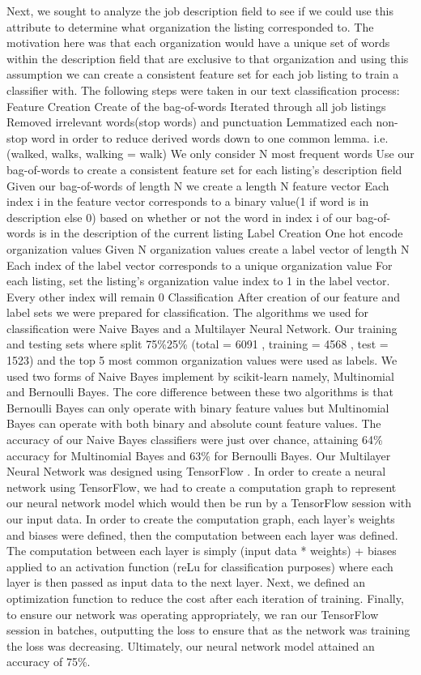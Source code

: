 Next, we sought to analyze the job description field to see if we could use this attribute to determine what organization the listing corresponded to. The motivation here was that each organization would have a unique set of words within the description field that are exclusive to that organization and using this assumption we can create a consistent feature set for each job listing to train a classifier with. The following steps were taken in our text classification process:
Feature Creation
Create of the bag-of-words 
Iterated through all job listings
Removed irrelevant words(stop words) and  punctuation
Lemmatized each non-stop word in order to reduce derived words down to one common lemma. i.e.(walked, walks, walking = walk)
We only consider N most frequent words 
Use our bag-of-words to create a consistent feature set for each listing’s description field
Given our bag-of-words of length N we create a length N feature vector
Each index i  in the feature vector corresponds to a binary value(1 if word is in description else 0) based on whether or not the word in index i of our bag-of-words is in the description of the current listing
Label Creation
One hot encode organization values
Given N organization values create a label vector of length N 
Each index of the label vector corresponds to a unique organization value 
For each listing, set the listing’s organization value index to 1 in the label vector. Every other index will remain 0
Classification
After creation of our feature and label sets we were prepared for classification. The algorithms we used for classification were Naive Bayes and a Multilayer Neural Network. Our training and testing sets where split 75\%25\% (total = 6091 , training = 4568 , test = 1523) and  the top 5 most common organization values were used as labels.  
We used two forms of Naive Bayes implement by scikit-learn namely, Multinomial and Bernoulli Bayes. The core difference between these two algorithms is that Bernoulli Bayes can only operate with binary feature values but Multinomial Bayes can operate with both binary and absolute count feature values. 
The accuracy of our Naive Bayes classifiers were just over chance, attaining 64\% accuracy for Multinomial Bayes and 63\% for Bernoulli Bayes. 
Our Multilayer Neural Network was designed using TensorFlow \cite{tensorFlow}. In order to create a neural network using TensorFlow, we had to create a computation graph to represent our neural network model which would then be run by a TensorFlow session with our input data. In order to create the computation graph, each layer’s weights and biases were defined, then the computation between each layer was defined. The computation between each layer is simply (input data * weights) + biases applied to an activation function (reLu for classification purposes) where each layer is then passed as input data to the next layer. Next, we defined an optimization function to reduce the cost after each iteration of training. Finally, to ensure our network was operating appropriately, we ran our TensorFlow session in batches, outputting the loss to ensure that as the network was training the loss was decreasing. Ultimately, our neural network model attained an accuracy of 75\%.

